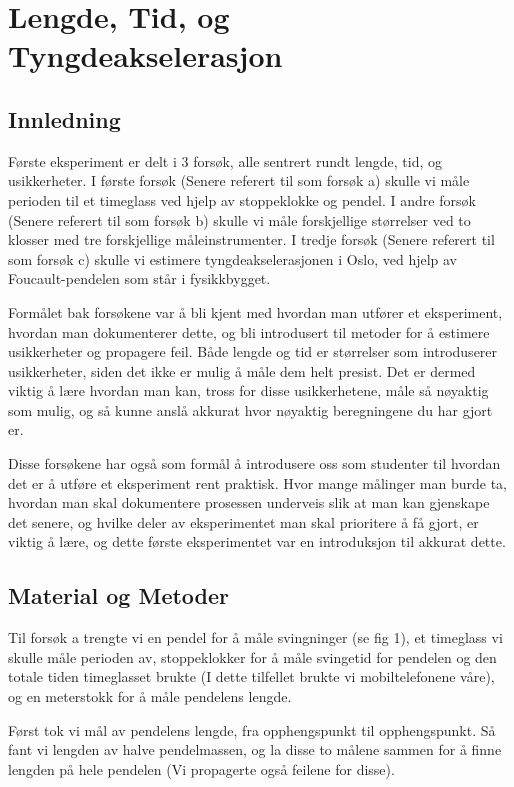 \section{Lengde, Tid, og Tyngdeakselerasjon}

\subsection{Innledning}

Første eksperiment er delt i 3 forsøk, alle sentrert rundt lengde, tid, og usikkerheter. I første forsøk (Senere referert til som forsøk a) skulle vi måle perioden til et timeglass ved hjelp av stoppeklokke og pendel. I andre forsøk (Senere referert til som forsøk b) skulle vi måle forskjellige størrelser ved to klosser med tre forskjellige
måleinstrumenter. I tredje forsøk (Senere referert til som forsøk c) skulle vi estimere tyngdeakselerasjonen i Oslo, ved hjelp av Foucault-pendelen som står i fysikkbygget.

Formålet bak forsøkene var å bli kjent med hvordan man utfører et eksperiment, hvordan man dokumenterer dette, og bli introdusert til metoder for å estimere usikkerheter og propagere feil. Både lengde og tid er størrelser som introduserer usikkerheter, siden det ikke er mulig å måle dem helt presist. Det er dermed viktig å lære hvordan man kan, tross for disse usikkerhetene, måle så nøyaktig som mulig, og så kunne anslå akkurat hvor nøyaktig beregningene du har gjort er.

Disse forsøkene har også som formål å introdusere oss som studenter til hvordan det er å utføre et eksperiment rent praktisk. Hvor mange målinger man burde ta, hvordan man skal dokumentere prosessen underveis slik at man kan gjenskape det senere, og hvilke deler av eksperimentet man skal prioritere å få gjort, er viktig å lære, og dette første eksperimentet var en introduksjon til akkurat dette. 

\subsection{Material og Metoder}

Til forsøk a trengte vi en pendel for å måle svingninger (se fig 1), et timeglass vi skulle måle perioden av, stoppeklokker for å måle svingetid for pendelen og den totale tiden timeglasset brukte (I dette tilfellet brukte vi mobiltelefonene våre), og en meterstokk for å måle pendelens lengde.

Først tok vi mål av pendelens lengde, fra opphengspunkt til opphengspunkt. Så fant vi lengden av halve pendelmassen, og la disse to målene sammen for å finne lengden på hele pendelen (Vi propagerte også feilene for disse).

